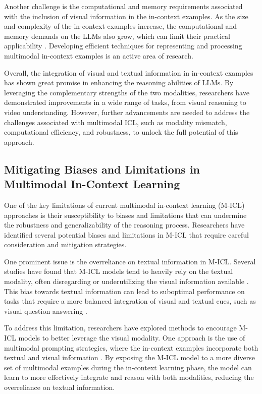 \documentclass[11pt]{article}
\begin{document}
Another challenge is the computational and memory requirements associated with the inclusion of visual information in the in-context examples. As the size and complexity of the in-context examples increase, the computational and memory demands on the LLMs also grow, which can limit their practical applicability \cite{ref301}. Developing efficient techniques for representing and processing multimodal in-context examples is an active area of research.

Overall, the integration of visual and textual information in in-context examples has shown great promise in enhancing the reasoning abilities of LLMs. By leveraging the complementary strengths of the two modalities, researchers have demonstrated improvements in a wide range of tasks, from visual reasoning to video understanding. However, further advancements are needed to address the challenges associated with multimodal ICL, such as modality mismatch, computational efficiency, and robustness, to unlock the full potential of this approach.

\subsection{Mitigating Biases and Limitations in Multimodal In-Context Learning}

One of the key limitations of current multimodal in-context learning (M-ICL) approaches is their susceptibility to biases and limitations that can undermine the robustness and generalizability of the reasoning process. Researchers have identified several potential biases and limitations in M-ICL that require careful consideration and mitigation strategies.

One prominent issue is the overreliance on textual information in M-ICL. Several studies have found that M-ICL models tend to heavily rely on the textual modality, often disregarding or underutilizing the visual information available \cite{ref297}. This bias towards textual information can lead to suboptimal performance on tasks that require a more balanced integration of visual and textual cues, such as visual question answering \cite{ref251}.

To address this limitation, researchers have explored methods to encourage M-ICL models to better leverage the visual modality. One approach is the use of multimodal prompting strategies, where the in-context examples incorporate both textual and visual information \cite{ref302}. By exposing the M-ICL model to a more diverse set of multimodal examples during the in-context learning phase, the model can learn to more effectively integrate and reason with both modalities, reducing the overreliance on textual information.
\end{document}
